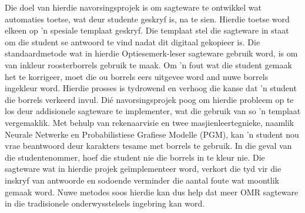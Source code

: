 
\begin{uittreksel}    %
Die doel van hierdie navorsingsprojek is om sagteware te ontwikkel wat automaties toetse, wat deur studente geskryf is, na te sien. Hierdie toetse word elkeen op 'n spesiale templaat geskryf. Die templaat stel die sagteware in staat om die student se antwoord te vind nadat dit digitaal gekopieer is. Die standaardmetode wat in hierdie Optiesemerk-leser sagteware gebruik word, is om van inkleur roosterborrels gebruik te maak. Om 'n fout wat die student gemaak het te korrigeer, moet die ou borrels eers uitgevee word and nuwe borrels ingekleur word. Hierdie prosses is tydrowend en verhoog die kanse dat 'n student die borrels verkeerd invul. Dié navorsingsprojek poog om hierdie probleem op te los deur addisionele sagteware te implementer, wat die gebruik van so 'n templaat vergemaklik. Met behulp van rekenaarvisie en twee masjienleertegnieke, naamlik Neurale Netwerke en Probabilistiese Grafiese Modelle (PGM), kan 'n student nou vrae beantwoord deur karakters tesame met borrels te gebruik. In die geval van die studentenommer, hoef die student nie die borrels in te kleur nie. Die sagteware wat in hierdie projek geïmplementeer word, verkort die tyd vir die inskryf van antwoorde en sodoende verminder die aantal foute wat moontlik gemaak word. Nuwe metodes soos hierdie kan dus help dat meer OMR sagteware in die tradisionele onderwysstelsels ingebring kan word.
\end{uittreksel}